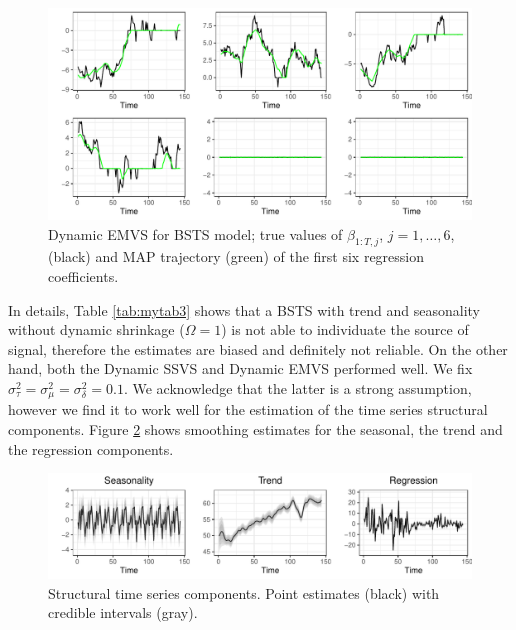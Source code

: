 \documentclass[
  12pt,
]{book}
\theoremstyle{break}
\theoremstyle{nonumberplain}
\begin{document}
\begin{figure}[h]

{\centering \includegraphics{Dynamic-Shrinkage-in-Bayesian-Structural-Time-Series-and-Vector-Autoregressive-Models_files/figure-latex/myfig8-1} 

}

\caption{Dynamic EMVS for BSTS model; true values of $\beta_{1:T, j}$, $j=1, \ldots, 6$, (black) and MAP trajectory (green) of the first six regression coefficients.}\label{fig:myfig8}
\end{figure}

In details, Table \ref{tab:mytab3} shows that a BSTS with trend and
seasonality without dynamic shrinkage (\(\Omega=1\)) is not able to
individuate the source of signal, therefore the estimates are biased and
definitely not reliable. On the other hand, both the Dynamic SSVS and
Dynamic EMVS performed well. We fix
\(\sigma^{2}_{\tau}=\sigma^{2}_{\mu}=\sigma^{2}_{\delta}=0.1\). We
acknowledge that the latter is a strong assumption, however we find it
to work well for the estimation of the time series structural
components. Figure \ref{fig:myfig14} shows smoothing estimates for the
seasonal, the trend and the regression components.

\begin{figure}[H]

{\centering \includegraphics{Dynamic-Shrinkage-in-Bayesian-Structural-Time-Series-and-Vector-Autoregressive-Models_files/figure-latex/myfig14-1} 

}

\caption{Structural time series components. Point estimates (black) with credible intervals (gray).}\label{fig:myfig14}
\end{figure}
\end{document}
